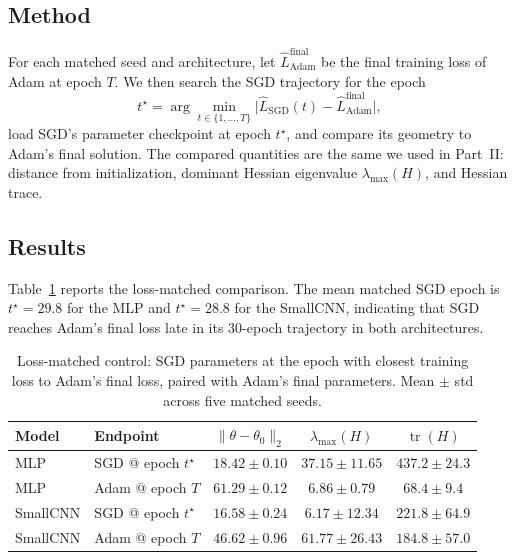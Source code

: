 \subsection{Method}

For each matched seed and architecture, let $\widehat L_{\mathrm{Adam}}^{\mathrm{final}}$ be the final training loss of Adam at epoch $T$. We then search the SGD trajectory for the epoch
\[
t^\star = \arg\min_{t\in\{1,\dots,T\}} \big| \widehat L_{\mathrm{SGD}}(t) - \widehat L_{\mathrm{Adam}}^{\mathrm{final}}\big|,
\]
load SGD's parameter checkpoint at epoch $t^\star$, and compare its geometry to Adam's final solution. The compared quantities are the same we used in Part~II: distance from initialization, dominant Hessian eigenvalue $\lambda_{\max}(H)$, and Hessian trace.

\subsection{Results}

Table~\ref{tab:loss-matched} reports the loss-matched comparison. The mean matched SGD epoch is $t^\star = 29.8$ for the MLP and $t^\star = 28.8$ for the SmallCNN, indicating that SGD reaches Adam's final loss late in its 30-epoch trajectory in both architectures.

\begin{table}[H]
\centering
\small
\setlength{\tabcolsep}{4pt}
\begin{tabular}{llccc}
\toprule
\textbf{Model} & \textbf{Endpoint} & $\|\theta-\theta_0\|_2$ & $\lambda_{\max}(H)$ & $\operatorname{tr}(H)$ \\
\midrule
MLP      & SGD @ epoch $t^\star$ & $18.42 \pm 0.10$ & $37.15 \pm 11.65$ & $437.2 \pm 24.3$ \\
MLP      & Adam @ epoch $T$      & $61.29 \pm 0.12$ & $6.86 \pm 0.79$   & $68.4 \pm 9.4$  \\
\addlinespace
SmallCNN & SGD @ epoch $t^\star$ & $16.58 \pm 0.24$ & $6.17 \pm 12.34$  & $221.8 \pm 64.9$ \\
SmallCNN & Adam @ epoch $T$      & $46.62 \pm 0.96$ & $61.77 \pm 26.43$ & $184.8 \pm 57.0$ \\
\bottomrule
\end{tabular}
\caption{Loss-matched control: SGD parameters at the epoch with closest training loss to Adam's final loss, paired with Adam's final parameters. Mean $\pm$ std across five matched seeds.}
\label{tab:loss-matched}
\end{table}


